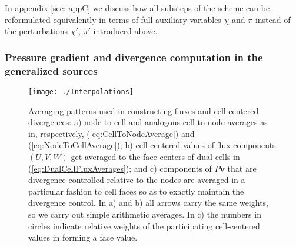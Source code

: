 \documentclass{ametsoc}
\newcommand{\sblue}[1]{\textcolor{sblue}{#1}}
\newcommand{\revision}[1]{\sblue{#1}}
\theoremstyle{definition}
\newcommand{\eq}[1]{(\ref{#1})}
\newcommand{\vect}[1]{{\mathbf{#1}}}
\newcommand{\vv}{\vect{v}}
\begin{document}
\revision{In appendix \ref{sec: appC} we discuss how all substeps of the scheme can be reformulated equivalently in terms of full auxiliary variables $\chi$ and $\pi$ instead of the perturbations $\chi'$, $\pi'$ introduced above.}


\subsubsection{Pressure gradient and divergence computation in the generalized sources}
\label{sssec:NodalDiscretization}


\begin{figure}
\centering
 \texttt{[image: ./Interpolations]}
 \caption{Averaging patterns used in constructing fluxes and cell-centered divergences: 
 a) node-to-cell and analogous cell-to-node averages as in, respectively, \eq{eq:CellToNodeAverage} and 
 \eq{eq:NodeToCellAverage}; 
 b) cell-centered values of flux components $(U,V,W)$ get averaged to the face centers 
 of dual cells in \eq{eq:DualCellFluxAverages}; 
 and c) components 
 of $P\vv$ that are divergence-controlled relative to the nodes are averaged in a 
 particular fashion to cell faces so as to exactly maintain the divergence control. In a) 
 and b) all arrows carry the same weights, so we carry out simple arithmetic averages. In
 c) the numbers in circles indicate relative weights of the participating cell-centered
 values in forming a face value.}
 \label{fig:Interpolations}
\end{figure}
\end{document}
